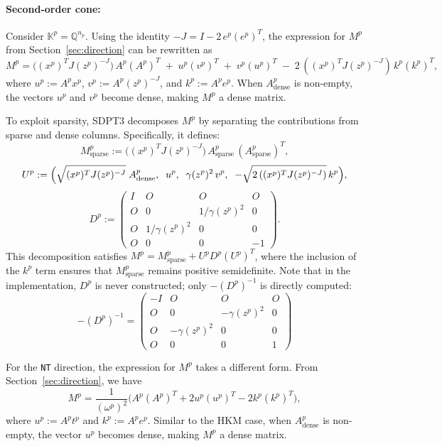 \paragraph{Second-order cone:}
Consider $\mathbb{K}^p=\mathbb{Q}^{n_p}$. 
Using the identity $-J = I - 2\,e^p(e^p)^T$, 
the expression for $M^p$ from Section~\ref{sec:direction} can be rewritten as
\[
  M^p 
  = \bigl((x^p)^T J (z^p)^{-J}\bigr)\, A^p(A^p)^T
    \;+\; u^p (v^p)^T
    \;+\; v^p (u^p)^T
    \;-\; 2\,((x^p)^T J (z^p)^{-J})\, k^p (k^p)^T,
\]
where $u^p := A^p x^p$, $v^p := A^p (z^p)^{-J}$, and $k^p := A^p e^p$.
When $A^p_{\mathrm{dense}}$ is non-empty, the vectors $u^p$ and $v^p$ become dense, 
making $M^p$ a dense matrix.

To exploit sparsity, SDPT3 decomposes $M^p$ by separating the contributions 
from sparse and dense columns. Specifically, it defines:
\[
  M^p_{\mathrm{sparse}}
    := \bigl((x^p)^T J (z^p)^{-J}\bigr)\,
       A^p_{\mathrm{sparse}}\,(A^p_{\mathrm{sparse}})^T,
\]
\[
  U^p
    := \Bigl(
       \sqrt{(x^p)^T J (z^p)^{-J}}\;A^p_{\mathrm{dense}},
       \;\; u^p,
       \;\; \gamma(z^p)^2\,v^p,
       \;\; -\sqrt{2\,((x^p)^T J (z^p)^{-J})}\,k^p
    \Bigr),
\]
\[
  D^p
    := \begin{pmatrix}
         I & O & O & O \\
         O & 0 & 1/\gamma(z^p)^2 & 0 \\
         O & 1/\gamma(z^p)^2 & 0 & 0 \\
         O & 0 & 0 & -1
       \end{pmatrix}.
\]
This decomposition satisfies $M^p = M^p_{\mathrm{sparse}} + U^p D^p (U^p)^T$, 
where the inclusion of the $k^p$ term ensures that $M^p_{\mathrm{sparse}}$ 
remains positive semidefinite. 
Note that in the implementation, $D^p$ is never constructed; 
only $-(D^p)^{-1}$ is directly computed:
\[
  -(D^p)^{-1}
  = \begin{pmatrix}
      -I & O & O & O \\
      O & 0 & -\gamma(z^p)^2 & 0 \\
      O & -\gamma(z^p)^2 & 0 & 0 \\
      O & 0 & 0 & 1
    \end{pmatrix}
\]

For the \texttt{NT} direction, the expression for $M^p$ takes a different form.
From Section~\ref{sec:direction}, we have
\[
  M^p
  = \frac{1}{(\omega^p)^2} \Big(
      A^p (A^p)^T + 2 u^p (u^p)^T - 2k^p (k^p)^T
  \Big),
\]
where $u^p := A^p t^p$ and $k^p := A^p e^p$.
Similar to the HKM case, when $A^p_{\mathrm{dense}}$ is non-empty, 
the vector $u^p$ becomes dense, making $M^p$ a dense matrix.

